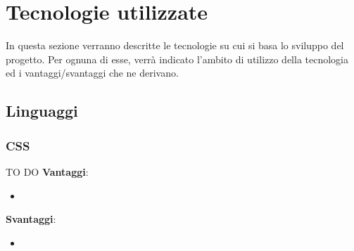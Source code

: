 %
%


\section{Tecnologie utilizzate} %
\label{sec:tecnologie_utilizzate}
In questa sezione verranno descritte le tecnologie su cui si basa lo sviluppo del progetto. Per ognuna di esse, verrà indicato l’ambito di utilizzo della tecnologia ed i vantaggi/svantaggi che ne derivano.

	\subsection{Linguaggi} %
	\label{sub:linguaggi}

		\subsubsection{CSS} %
		\label{ssub:css}
		TO DO \newline
		\textbf{Vantaggi}:
			\begin{itemize}
				\item 
			\end{itemize}
			\noindent
		
		\textbf{Svantaggi}:
			\begin{itemize}
				\item 
			\end{itemize}
			\noindent

